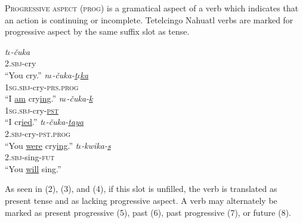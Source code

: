 \documentclass[doc,12pt]{apa6}
\begin{document}
\textsc{Progressive aspect} (\textsc{prog}) is a gramatical aspect of a verb which
indicates that an action is continuing or incomplete. Tetelcingo Nahuatl verbs
are marked for progressive aspect by the same suffix slot as tense.

\begin{exe}
	\ex \textit{t$\iota$-\v{c}uka} \\
		\textsc{2.sbj}-cry \\
		``You cry.''
	\ex \textit{n$\iota$-\v{c}uka-\underline{t$\iota$ka}} \\
		\textsc{1sg.sbj}-cry-\textsc{prs.prog} \\
		``I \underline{am} cry\underline{ing}.''
	\ex \textit{n$\iota$-\v{c}uka-\underline{k}} \\
		\textsc{1sg.sbj}-cry-\underline{\textsc{pst}} \\
		``I cr\underline{ied}.''
	\ex \textit{t$\iota$-\v{c}uka-\underline{taya}} \\
		\textsc{2.sbj}-cry-\textsc{pst.prog} \\
		``You \underline{were} cry\underline{ing}.''
	\ex \textit{t$\iota$-kwika-\underline{s}} \\
		\textsc{2.sbj}-sing-\textsc{fut} \\
		``You \underline{will} sing.''
\end{exe}

As seen in (2), (3), and (4), if this slot is unfilled, the verb is translated
as present tense and as lacking progressive aspect. A verb may alternately be
marked as present progressive (5), past (6), past progressive (7), or future
(8).
\end{document}
